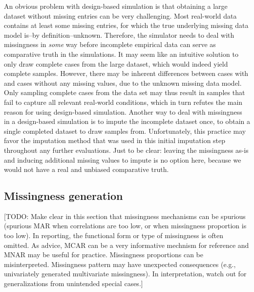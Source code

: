 \documentclass[bimj,fleqn]{w-art}
\begin{document}
An obvious problem with design-based simulation is that obtaining a large dataset without missing entries can be very challenging. Most real-world data contains at least some missing entries, for which the true underlying missing data model is--by definition--unknown. Therefore, the simulator needs to deal with missingness in \textit{some} way before incomplete empirical data can serve as comparative truth in the simulations. It may seem like an intuitive solution to only draw complete cases from the large dataset, which would indeed yield complete samples. However, there may be inherent differences between cases with and cases without any missing values, due to the unknown missing data model. Only sampling complete cases from the data set may thus result in samples that fail to capture all relevant real-world conditions, which in turn refutes the main reason for using design-based simulation. Another way to deal with missingness in a design-based simulation is to impute the incomplete dataset once, to obtain a single completed dataset to draw samples from. Unfortunately, this practice may favor the imputation method that was used in this initial imputation step throughout any further evaluations. Just to be clear: leaving the missingness as-is and inducing additional missing values to impute is no option here, because we would not have a real and unbiased comparative truth.






\subsection{Missingness generation}

[TODO: Make clear in this section that missingness mechanisms can be spurious (spurious MAR when correlations are too low, or when missingness proportion is too low). In reporting, the functional form or type of missingness is often omitted. As advice, MCAR can be a very informative mechnism for reference and MNAR may be useful for practice. Missingness proportions can be misinterpreted. Missingness pattern may have unexpected consequences (e.g., univariately generated multivariate missingness). In interpretation, watch out for generalizations from unintended special cases.]
\end{document}
